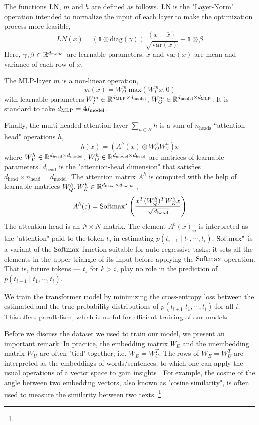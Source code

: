 The functions $\text{LN}$, $m$ and $h$ are defined as follows. $\text{LN}$ is the "Layer-Norm" operation intended to normalize the input of each layer to make the optimization process more feasible,
\[
LN(x) = \left(\mathbb{1} \otimes \text{diag}(\gamma) \right) \frac{(x-\overline{x})}{\sqrt{\text{var}(x)}} + \mathbb{1} \otimes \beta
\]
Here, $\gamma, \beta \in \mathbb{R}^{d_{\text{model}}}$ are learnable parameters. $\overline{x}$ and $\text{var}(x)$ are mean and variance of each row of $x$.

The MLP-layer $m$ is a non-linear operation, 
\[
m(x) =W^m_O \ \text{max}(W_I^m x, 0)
\]
with learnable parameters $W^m_I \in \mathbb{R}^{d_{\text{MLP}} \times d_{\text{model}}}$, $W^m_O \in \mathbb{R}^{d_{\text{model}} \times d_{\text{MLP}}}$. It is standard to take $d_{\text{MLP}} = 4 d_{\text{model}}$.

Finally, the multi-headed attention-layer $\sum_{h \in H} h$ is a sum of $n_{\text{heads}}$ ``attention-head" operations $h$, 
\[
h(x) = (A^h(x) \otimes W^h_O W^h_V) x
\]
where $W^h_V \in \mathbb{R}^{d_{\text{head}} \times d_{\text{model}}}$, 
$W^h_O \in \mathbb{R}^{d_{\text{model}} \times d_{\text{head}}}$ 
are matrices of learnable parameters. 
$d_{\text{head}}$ is the "attention-head dimension" that satisfies $d_{\text{head}} \times n_{\text{head}} = d_{\text{model}}$. 
The attention matrix $A^h$ is computed with the help of learnable matrices 
$W^h_Q, W^h_K \in \mathbb{R}^{d_{\text{head}} \times d_{\text{model}}}$,
\[
A^h(x) = \text{Softmax}^\star \left(\frac{x^T (W^h_Q)^T W^h_K x}{\sqrt{d_{\text{head}}}}\right)
\] 
The attention-head is an $N \times N$ matrix. The element $A^h(x)_{ij}$ 
is interpreted as the "attention" paid to the token 
$t_j$ in estimating 
$p(t_{i+1} \mid t_1, \cdots, t_i)$. $\text{Softmax}^\star$
is a variant of the $\text{Softmax}$ function suitable for auto-regressive tasks: it sets all the elements in the upper triangle of its input before applying the 
$\text{Softmax}$ operation. 
That is, future tokens --- $t_k$ for $k > i$, play no role in the prediction of $p(t_{i+1} \mid t_1, \cdots, t_i)$.

We train the transformer model by minimizing the cross-entropy loss between the estimated and the true probability distributions of $p(t_{i+1} | t_1, \cdots, t_{i})$ for all $i$. This offers parallelism, which is useful for efficient training of our models. 

Before we discuss the dataset we used to train our model, we present an important remark. In practice, the embedding matrix $W_E$ and the unembedding matrix $W_U$ are often "tied" together, i.e. $W_E = W_U^T$. The rows of $W_E = W_U^T$ are interpreted as the embeddings of words/sentences, to which one can apply the usual operations of a vector space to gain insights \cite{Bengio:2003}. For example, the cosine of the angle between two embedding vectors, also known as "cosine similarity", is often used to measure the similarity between two texts. \footnote{}


